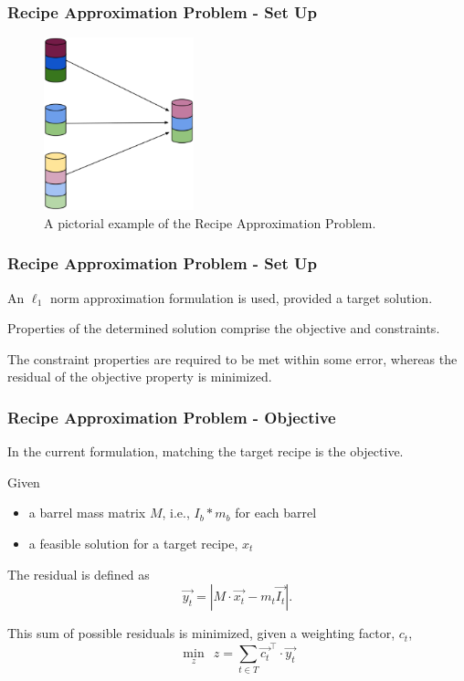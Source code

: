 \begin{frame}[ctb!]
  \frametitle{Recipe Approximation Problem - Set Up} 
  \begin{figure}
    \includegraphics[height=5cm]{./images/rap.eps}
    \caption{A pictorial example of the Recipe Approximation Problem.}
  \end{figure}
\end{frame}

\begin{frame}[ctb!]
  \frametitle{Recipe Approximation Problem - Set Up} 

  An $\ell_1$ norm approximation formulation is used, provided a target
  solution.\vspace{0.2cm}
  
  Properties of the determined solution comprise the objective and
  constraints.\vspace{0.2cm}

  The constraint properties are required to be met within some error, whereas
  the residual of the objective property is minimized.
\end{frame}

\begin{frame}[ctb!]
  \frametitle{Recipe Approximation Problem - Objective}

  In the current formulation, matching the target recipe is the objective.

  Given
  \begin{itemize}
    \item a barrel mass matrix $M$, i.e., $I_b * m_b$ for each barrel
    \item a feasible solution for a target recipe, $x_t$
  \end{itemize}
  
  The residual is defined as
  \begin{equation}\label{eqs:residual}
    \vec{y_{t}} = \left| M \cdot \vec{x_{t}}  - m_t \vec{I_{t}} \right|.
  \end{equation}

  This sum of possible residuals is minimized, given a weighting factor, $c_t$,
  \begin{equation}\label{rap-obj}
    \min_{z} \:\: z = \sum_{t \in T} \vec{c_{t}}^{\top} \cdot \vec{y_{t}}
  \end{equation}
\end{frame}

